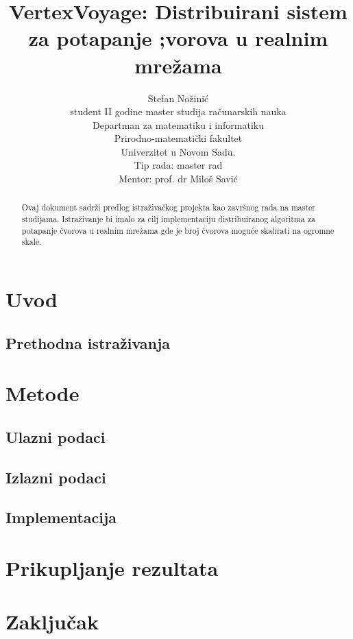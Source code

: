 \documentclass[]{amsart}
\begin{document}
\title{VertexVoyage: Distribuirani sistem za potapanje ;vorova u realnim mrežama}
\author{Stefan Nožinić \\
student II godine master studija računarskih nauka \\
Departman za matematiku i informatiku \\
Prirodno-matematički fakultet \\
Univerzitet u Novom Sadu. \\
Tip rada: master rad \\
Mentor: \MakeLowercase{prof. dr} Miloš Savić
}

\begin{abstract}
    Ovaj dokument sadrži predlog istraživačkog projekta kao završnog rada na master studijama.
    Istraživanje bi imalo za cilj implementaciju distribuiranog algoritma za potapanje čvorova u realnim mrežama gde je broj čvorova moguće skalirati na ogromne skale.     
\end{abstract}


\maketitle
\newpage


\section{Uvod}
\label{sec:introduction}

\cite{grover2016node2vec}
\cite{lombardo2019actornode2vec}

\subsection{Prethodna istraživanja}
\label{sec:prev_work}

\section{Metode}
\label{sec:methods}
\subsection{Ulazni podaci}
\label{sec:input_data}


\subsection{Izlazni podaci}
\label{sec:output_data}



\subsection{Implementacija}
\label{sec:implementation}

\section{Prikupljanje rezultata}
\label{sec:results}




\section{Zaključak}
\label{sec:conclusion}



\end{document}
